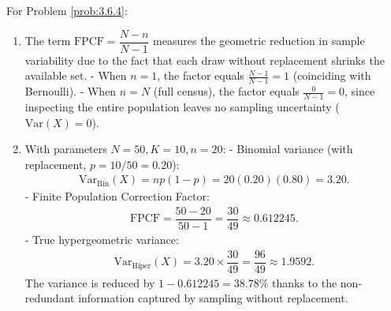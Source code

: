 \begin{solucion}
	\label{sol:3.6.4}
	For Problem \ref{prob:3.6.4}:
	\begin{enumerate}
		\item The term $\text{FPCF} = \dfrac{N-n}{N-1}$ measures the geometric reduction in sample variability due to the fact that each draw without replacement shrinks the available set.
		- When $n=1$, the factor equals $\frac{N-1}{N-1} = 1$ (coinciding with Bernoulli).
		- When $n=N$ (full census), the factor equals $\frac{0}{N-1} = 0$, since inspecting the entire population leaves no sampling uncertainty ($\text{Var}(X) = 0$).
		\item With parameters $N=50, K=10, n=20$:
		- Binomial variance (with replacement, $p = 10/50 = 0.20$):
		  \begin{align*}
		  	\text{Var}_{\text{Bin}}(X) = np(1-p) = 20(0.20)(0.80) = 3.20.
		  \end{align*}
		- Finite Population Correction Factor:
		  \begin{align*}
		  	\text{FPCF} = \dfrac{50-20}{50-1} = \dfrac{30}{49} \approx 0.612245.
		  \end{align*}
		- True hypergeometric variance:
		  \begin{align*}
		  	\text{Var}_{\text{Hiper}}(X) = 3.20 \times \dfrac{30}{49} = \dfrac{96}{49} \approx 1.9592.
		  \end{align*}
		The variance is reduced by $1 - 0.612245 = 38.78\%$ thanks to the non-redundant information captured by sampling without replacement.
	\end{enumerate}
\end{solucion}


